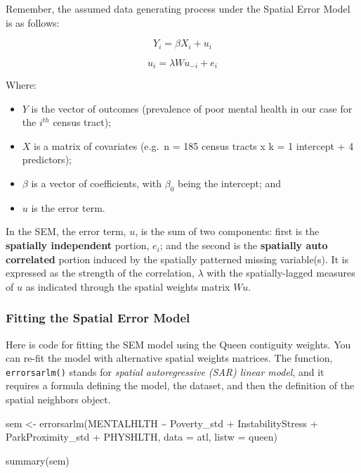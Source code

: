\documentclass[
]{book}
\newenvironment{Shaded}{\begin{snugshade}}{\end{snugshade}}
\newcommand{\AttributeTok}[1]{\textcolor[rgb]{0.77,0.63,0.00}{#1}}
\newcommand{\FunctionTok}[1]{\textcolor[rgb]{0.00,0.00,0.00}{#1}}
\newcommand{\NormalTok}[1]{#1}
\newcommand{\OtherTok}[1]{\textcolor[rgb]{0.56,0.35,0.01}{#1}}
\newcommand{\SpecialCharTok}[1]{\textcolor[rgb]{0.00,0.00,0.00}{#1}}
\providecommand{\tightlist}{%
  \setlength{\itemsep}{0pt}\setlength{\parskip}{0pt}}
\begin{document}
Remember, the assumed data generating process under the Spatial Error Model is as follows:

\[Y_i=\beta X_i+u_i\]

\[u_i=\lambda Wu_{-i}+e_i\]

Where:

\begin{itemize}
\tightlist
\item
  \(Y\) is the vector of outcomes (prevalence of poor mental health in our case for the \(i^{th}\) census tract);
\item
  \(X\) is a matrix of covariates (e.g.~n = 185 census tracts x k = 1 intercept + 4 predictors);
\item
  \(\beta\) is a vector of coefficients, with \(\beta_0\) being the intercept; and
\item
  \(u\) is the error term.
\end{itemize}

In the SEM, the error term, \(u\), is the sum of two components: first is the \textbf{spatially independent} portion, \(e_i\); and the second is the \textbf{spatially auto correlated} portion induced by the spatially patterned missing variable(s). It is expressed as the strength of the correlation, \(\lambda\) with the spatially-lagged measures of \(u\) as indicated through the spatial weights matrix \(Wu\).

\hypertarget{fitting-the-spatial-error-model}{%
\subsubsection{Fitting the Spatial Error Model}\label{fitting-the-spatial-error-model}}

Here is code for fitting the SEM model using the Queen contiguity weights. You can re-fit the model with alternative spatial weights matrices. The function, \texttt{errorsarlm()} stands for \emph{spatial autoregressive (SAR) linear model}, and it requires a formula defining the model, the dataset, and then the definition of the spatial neighbors object.

\begin{Shaded}
\begin{Highlighting}[]
\NormalTok{sem }\OtherTok{\textless{}{-}} \FunctionTok{errorsarlm}\NormalTok{(MENTALHLTH }\SpecialCharTok{\textasciitilde{}}\NormalTok{ Poverty\_std }\SpecialCharTok{+}\NormalTok{ InstabilityStress }\SpecialCharTok{+}\NormalTok{ ParkProximity\_std  }\SpecialCharTok{+}\NormalTok{ PHYSHLTH,}
                  \AttributeTok{data =}\NormalTok{ atl,}
                  \AttributeTok{listw =}\NormalTok{ queen)}

\FunctionTok{summary}\NormalTok{(sem)}
\end{Highlighting}
\end{Shaded}
\end{document}

